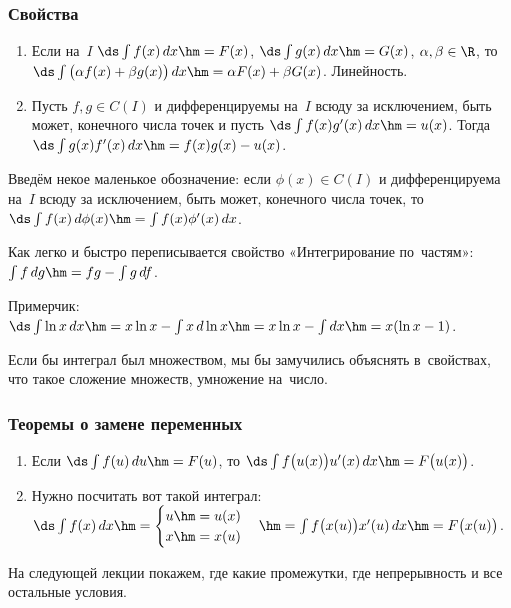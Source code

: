 \documentclass[a4paper,10pt,twoside]{article}
\begin{document}
\subsubsection{Свойства}

\begin{enumerate}
  \item Если на~$I$ $\ds\int f(x)\,dx \hm= F(x)$, $\ds\int g(x)\,dx\hm=G(x)$, $\alpha,\beta\in\R$, то $\ds\int\big(\alpha f(x)+\beta g(x)\big)\,dx\hm=\alpha F(x) +\beta G(x)$. Линейность.

  \item Пусть $f,g\in C(I)$ и дифференцируемы на~$I$ всюду за исключением, быть может, конечного числа точек и пусть $\ds\int f(x)g'(x)\,dx \hm= u(x)$.
  Тогда $\ds\int g(x)f'(x)\,dx\hm=f(x)g(x)-u(x)$.
\end{enumerate}

Введём некое маленькое обозначение: если $\phi(x)\in C(I)$ и дифференцируема на~$I$ всюду за исключением, быть может, конечного числа точек, то
$\ds\int f(x)\,d\phi(x)\hm=\int f(x)\phi'(x)\,dx$.

Как легко и быстро переписывается свойство «Интегрирование по~частям»: $\int f\,dg \hm= fg-\int g\,df$.

Примерчик: $\ds\int\ln x\, dx \hm= x\ln x-\int x\,d\ln x\hm=x\ln x - \int dx \hm= x(\ln x - 1)$.

Если бы интеграл был множеством, мы бы замучились объяснять в~свойствах, что такое сложение множеств, умножение на~число.

\subsubsection{Теоремы о замене переменных}

\begin{enumerate}
  \item Если $\ds\int f(u)\,du\hm=F(u)$, то $\ds\int f\big(u(x)\big)u'(x)\,dx\hm=F\big(u(x)\big)$.

  \item Нужно посчитать вот такой интеграл: $\ds\int f(x)\, dx \hm= \begin{cases}u\hm=u(x)\\ x\hm=x(u)\end{cases}\hm=\int f\big(x(u)\big)x'(u)\,dx \hm= F\big(x(u)\big)$.
\end{enumerate}

На следующей лекции покажем, где какие промежутки, где непрерывность и все остальные условия.
\end{document}
